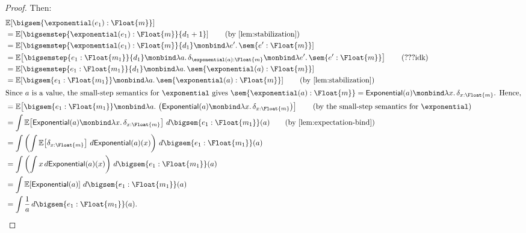 \begin{proof}
  Then:
  \begin{align*}
    &\mathbb{E}[\bigsem{\exponential(e_1) : \Float{m}}]\\
    &=
    \mathbb{E}\!\left[
      \bigsemstep{\exponential(e_1) : \Float{m}}{d_1+1}
    \right] \tag{by~\Cref{lem:stabilization}}\\
    &=
    \mathbb{E}\!\left[
      \bigsemstep{\exponential(e_1) : \Float{m}}{d_1}
      \monbind
      \lambda e'.\,\sem{e' : \Float{m}}
    \right]\\
    &=
    \mathbb{E}\!\left[
      \bigsemstep{e_1 : \Float{m_1}}{d_1}
      \monbind
      \lambda a.\,
        \delta_{\exponential(a) : \Float{m}}
      \monbind
      \lambda e'.\,\sem{e' : \Float{m}}
    \right] \tag{???idk}\\
    &=
    \mathbb{E}\!\left[\bigsemstep{e_1 : \Float{m_1}}{d_1}
    \monbind
    \lambda a.\,
      \sem{\exponential(a) : \Float{m}} \right] \\
    &=
    \mathbb{E}\!\left[\bigsem{e_1 : \Float{m_1}}
    \monbind
    \lambda a.\,
      \sem{\exponential(a) : \Float{m}}\right] \tag{by~\Cref{lem:stabilization}}\\
  \intertext{Since $a$ is a value, the small-step semantics for $\exponential$ gives
  $\sem{\exponential(a) : \Float{m}}
  =
  \mathsf{Exponential}(a)
  \monbind
  \lambda x.\,\delta_{x : \Float{m}}$. Hence,}
    &=
    \mathbb{E}\!\left[\bigsem{e_1 : \Float{m_1}}
    \monbind
    \lambda a.\,
      \left(
        \mathsf{Exponential}(a)
        \monbind
        \lambda x.\,\delta_{x : \Float{m}}
      \right)\right] \tag{by the small-step semantics for $\exponential$}\\
    &=
    \int
      \mathbb{E}\!\left[
        \mathsf{Exponential}(a)
        \monbind
        \lambda x.\,\delta_{x : \Float{m}}
      \right]
    \,d\bigsem{e_1 : \Float{m_1}}(a) \tag{by~\Cref{lem:expectation-bind}}\\
    &=
    \int
      \left(
      \int
        \mathbb{E}\!\left[
          \delta_{x : \Float{m}}
        \right]
      \,d\mathsf{Exponential}(a)(x)
      \right)
    \,d\bigsem{e_1 : \Float{m_1}}(a) \\
    &=
    \int
      \left(
      \int
        x
      \,d\mathsf{Exponential}(a)(x)
      \right)
    \,d\bigsem{e_1 : \Float{m_1}}(a) \\
    &=
    \int
      \mathbb{E}\!\left[
        \mathsf{Exponential}(a)
      \right]
    \,d\bigsem{e_1 : \Float{m_1}}(a) \\
    &=
    \int
      \frac{1}{a}
    \,d\bigsem{e_1 : \Float{m_1}}(a).
  \end{align*}


\end{proof}
